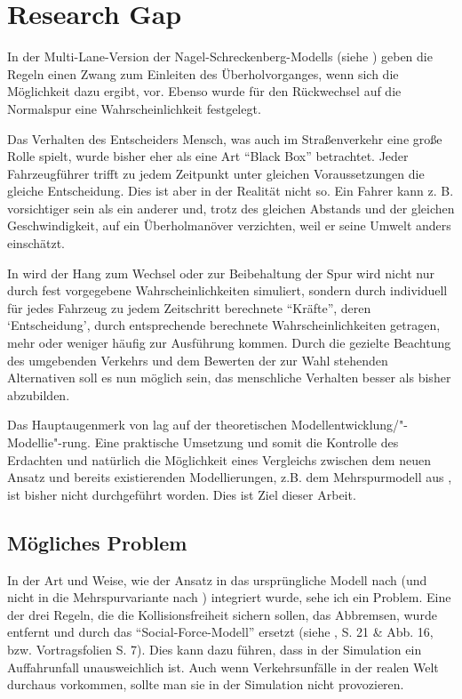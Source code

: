\section{Research Gap}
\label{sec:researchgap}

In der Multi-Lane-Version der Nagel-Schreckenberg-Modells (siehe \cite{multi-lane}) geben die Regeln einen Zwang zum Einleiten des Überholvorganges, wenn sich die Möglichkeit dazu ergibt, vor. Ebenso wurde für den Rückwechsel auf die Normalspur eine Wahrscheinlichkeit festgelegt.

Das Verhalten des Entscheiders Mensch, was auch im Straßenverkehr eine große Rolle spielt, wurde bisher eher als eine Art \enquote{Black Box} betrachtet. 
Jeder Fahrzeugführer trifft zu jedem Zeitpunkt unter gleichen Voraussetzungen die gleiche Entscheidung. 
Dies ist aber in der Realität nicht so. 
Ein Fahrer kann z. B. vorsichtiger sein als ein anderer und, trotz des gleichen Abstands und der gleichen Geschwindigkeit, auf ein Überholmanöver verzichten, weil er seine Umwelt anders einschätzt.

In \cite{dat-ba} wird der Hang zum Wechsel oder zur Beibehaltung der Spur wird nicht nur durch fest vorgegebene Wahrscheinlichkeiten simuliert, sondern durch individuell für jedes Fahrzeug zu jedem Zeitschritt berechnete \enquote{Kräfte}, deren \enquote*{Entscheidung}, durch entsprechende berechnete Wahrscheinlichkeiten getragen, mehr oder weniger häufig zur Ausführung kommen. 
Durch die gezielte Beachtung des umgebenden Verkehrs und dem Bewerten der zur Wahl stehenden Alternativen soll es nun möglich sein, das menschliche Verhalten besser als bisher abzubilden.

Das Hauptaugenmerk von \cite{dat-ba} lag auf der theoretischen Modellentwicklung/"-Modellie"-rung. 
Eine praktische Umsetzung und somit die Kontrolle des Erdachten und natürlich die Möglichkeit eines Vergleichs zwischen dem neuen Ansatz und bereits existierenden Modellierungen, z.B. dem Mehrspurmodell aus \cite{multi-lane}, ist bisher nicht durchgeführt worden. 
Dies ist Ziel dieser Arbeit.

\subsection*{Mögliches Problem}

In der Art und Weise, wie der Ansatz in das ursprüngliche Modell nach \cite{na-sch} (und nicht in die Mehrspurvariante nach \cite{multi-lane}) integriert wurde, sehe ich ein Problem.
Eine der drei Regeln, die die Kollisionsfreiheit sichern sollen, das Abbremsen, wurde entfernt und durch das \enquote{Social-Force-Modell} ersetzt (siehe \cite{dat-ba}, S. 21 \& Abb. 16, bzw. Vortragsfolien S. 7).
Dies kann dazu führen, dass in der Simulation ein Auffahrunfall unausweichlich ist.
Auch wenn Verkehrsunfälle in der realen Welt durchaus vorkommen, sollte man sie in der Simulation nicht provozieren.

